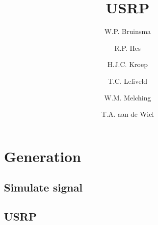 \documentclass[report, oneside, a4paper, openany]{memoir}
\title{USRP}
\author{W.P. Bruinsma \and R.P. Hes \and H.J.C. Kroep \and T.C. Leliveld \and W.M. Melching \and T.A. aan de Wiel}
\begin{document}
\chapter{Generation}

\section{Simulate signal}

\section{USRP}
\end{document}
